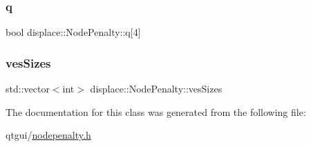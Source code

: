 \subsubsection{\texorpdfstring{q}{q}}
{\footnotesize\ttfamily bool displace\+::\+Node\+Penalty\+::q\mbox{[}4\mbox{]}}

\mbox{\label{classdisplace_1_1_node_penalty_a7447cdb18d6a93118fd04aeaf3d9c055}} 
\subsubsection{\texorpdfstring{vesSizes}{vesSizes}}
{\footnotesize\ttfamily std\+::vector$<$int$>$ displace\+::\+Node\+Penalty\+::ves\+Sizes}



The documentation for this class was generated from the following file\+:\begin{DoxyCompactItemize}
\item 
qtgui/\mbox{\hyperlink{nodepenalty_8h}{nodepenalty.\+h}}\end{DoxyCompactItemize}
